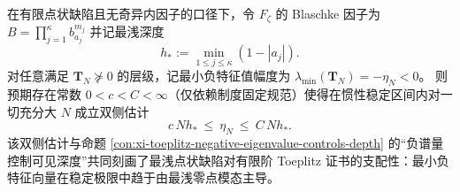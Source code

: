 \begin{conjecture}[深度--长度对偶的渐近可逆性]\label{conj:xi-toeplitz-depth-length-duality-asymptotic-invertibility}
在有限点状缺陷且无奇异内因子的口径下，令 \(F_{\zeta}\) 的 Blaschke 因子为
\(
B=\prod_{j=1}^{\kappa}b_{a_j}^{m_j}
\)
并记最浅深度
\[
h_\ast:=\min_{1\le j\le \kappa}(1-|a_j|).
\]
对任意满足 \(\mathbf{T}_N\nsucceq 0\) 的层级，记最小负特征值幅度为
\(
\lambda_{\min}(\mathbf{T}_N)=-\eta_N<0
\)。
则预期存在常数 \(0<c<C<\infty\)（仅依赖制度固定规范）使得在惯性稳定区间内对一切充分大 \(N\) 成立双侧估计
\[
\boxed{\;
c\,N h_\ast\ \le\ \eta_N\ \le\ C\,N h_\ast.\;}
\]
该双侧估计与命题 \ref{con:xi-toeplitz-negative-eigenvalue-controls-depth} 的“负谱量控制可见深度”共同刻画了最浅点状缺陷对有限阶 Toeplitz 证书的支配性：最小负特征向量在稳定极限中趋于由最浅零点模态主导。
\end{conjecture}

\endinput
